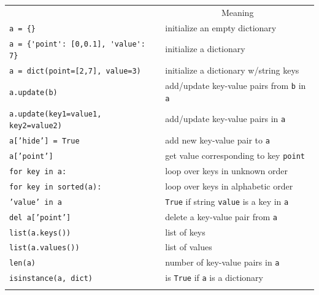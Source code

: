 \documentclass[graybox,envcountchap,sectrefs,final]{svmonodo}
\begin{document}
{\small   %

\vspace{4mm}

\begin{tabular}{ll}
\hline\noalign{\smallskip}
\multicolumn{1}{c}{ Construction } & \multicolumn{1}{c}{ Meaning } \\
\noalign{\smallskip}\svhline\noalign{\smallskip}
\Verb!a = {}!                             & initialize an empty dictionary                          \\
\Verb!a = {'point': [0,0.1], 'value': 7}! & initialize a dictionary                                 \\
\texttt{a = dict(point=[2,7], value=3)}     & initialize a dictionary w/string keys                   \\
\texttt{a.update(b)}                        & add/update key-value pairs from \texttt{b} in \texttt{a}    \\
\texttt{a.update(key1=value1, key2=value2)} & add/update key-value pairs in \texttt{a}                  \\
\texttt{a['hide'] = True}                   & add new key-value pair to \texttt{a}                      \\
\texttt{a['point']}                         & get value corresponding to key \texttt{point}             \\
\texttt{for key in a:}                      & loop over keys in unknown order                         \\
\texttt{for key in sorted(a):}              & loop over keys in alphabetic order                      \\
\texttt{'value' in a}                       & \texttt{True} if string \texttt{value} is a key in \texttt{a} \\
\texttt{del a['point']}                     & delete a key-value pair from \texttt{a}                   \\
\texttt{list(a.keys())}                     & list of keys                                            \\
\texttt{list(a.values())}                   & list of values                                          \\
\texttt{len(a)}                             & number of key-value pairs in \texttt{a}                   \\
\texttt{isinstance(a, dict)}                & is \texttt{True} if \texttt{a} is a dictionary              \\
\noalign{\smallskip}\hline\noalign{\smallskip}
\end{tabular}

\vspace{4mm}

}
\end{document}
